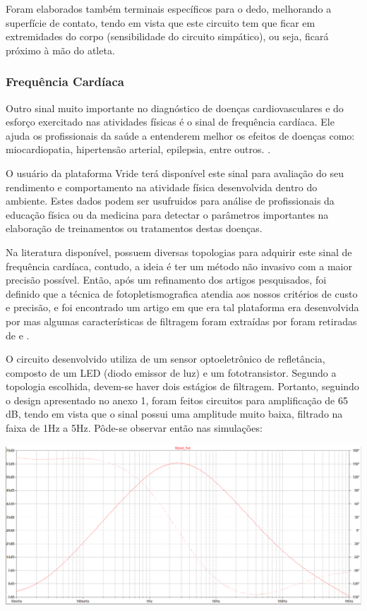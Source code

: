     Foram elaborados também terminais específicos para o dedo, melhorando a superfície de contato, tendo em vista que este circuito tem que ficar em extremidades do corpo (sensibilidade do circuito simpático), ou seja, ficará próximo à mão do atleta.
    

\subsubsection{Frequência Cardíaca}

Outro sinal muito importante no diagnóstico de doenças cardiovasculares e do esforço exercitado nas atividades físicas é o sinal de frequência cardíaca. Ele ajuda os profissionais da saúde a entenderem melhor os efeitos de doenças como: miocardiopatia, hipertensão arterial, epilepsia, entre outros. \cite{VANDERLEI2009} . 
	
O usuário da plataforma Vride terá disponível este sinal para avaliação do seu rendimento e comportamento na atividade física desenvolvida dentro do ambiente. Estes dados podem ser usufruidos para análise de profissionais da educação física ou da medicina para detectar o parâmetros importantes na elaboração de treinamentos ou tratamentos destas doenças. 
	
Na literatura disponível, possuem diversas topologias para adquirir este sinal de frequência cardíaca, contudo, a ideia é ter um método não invasivo com a maior precisão possível. Então, após um refinamento dos artigos pesquisados, foi definido que a técnica de fotopletismografica atendia aos nossos critérios de custo e precisão, e foi encontrado um artigo em que era tal plataforma era desenvolvida por %
mas algumas características de filtragem foram extraídas por foram retiradas de \cite{abhishek2015} e \cite{rheesokwoo2000} . 
	
O circuito desenvolvido utiliza de um sensor optoeletrônico de refletância, composto de um LED (diodo emissor de luz) e um fototransistor. Segundo a topologia escolhida, devem-se haver dois estágios de filtragem. Portanto, seguindo o design apresentado no anexo 1, foram feitos circuitos para amplificação de 65 dB, tendo em vista que o sinal possui uma amplitude muito baixa, filtrado na faixa de 1Hz a 5Hz. Pôde-se observar então nas simulações:
    
    \begin{center}
    	\includegraphics[scale=0.3]{figuras/Simulacao_Cardio}
        \label{cardio_sim}
    \end{center}
    
